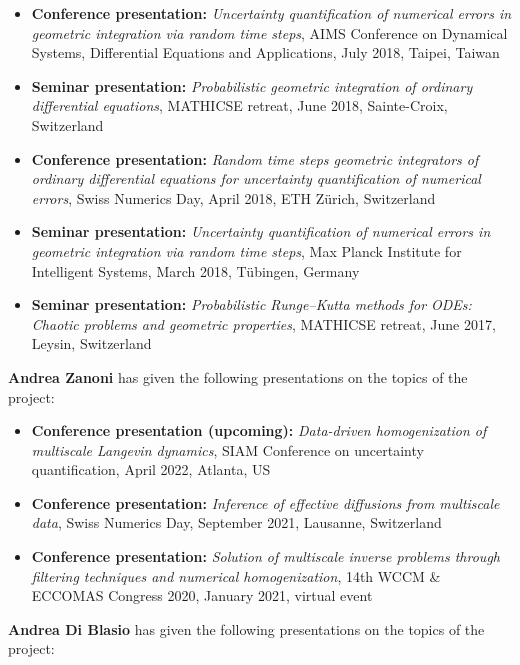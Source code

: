 \documentclass[10pt]{article}
\begin{document}
\begin{itemize}
	\item \textbf{Conference presentation:} \textit{Uncertainty quantification of numerical errors in geometric integration via random time steps}, AIMS Conference on Dynamical Systems, Differential Equations and Applications, July 2018, Taipei, Taiwan
	\item \textbf{Seminar presentation:} \textit{Probabilistic geometric integration of ordinary differential equations}, MATHICSE retreat, June 2018, Sainte-Croix, Switzerland
	\item \textbf{Conference presentation:} \textit{Random time steps geometric integrators of ordinary differential equations for uncertainty quantification of numerical errors}, Swiss Numerics Day, April 2018, ETH Zürich, Switzerland
	\item \textbf{Seminar presentation:} \textit{Uncertainty quantification of numerical errors in geometric integration via random time steps}, Max Planck Institute for Intelligent Systems, March 2018, Tübingen, Germany 
	\item \textbf{Seminar presentation:} \textit{Probabilistic Runge--Kutta methods for ODEs: Chaotic problems and geometric properties}, MATHICSE retreat, June 2017, Leysin, Switzerland
\end{itemize}
%
\textbf{Andrea Zanoni} has given the following presentations on the topics of the project:
\begin{itemize}
	\item \textbf{Conference presentation (upcoming):} \textit{Data-driven homogenization of multiscale Langevin dynamics}, SIAM Conference on uncertainty quantification, April 2022, Atlanta, US
	\item \textbf{Conference presentation:} \textit{Inference of effective diffusions from multiscale data}, Swiss Numerics Day, September 2021, Lausanne, Switzerland
	\item \textbf{Conference presentation:} \textit{Solution of multiscale inverse problems through filtering techniques and numerical homogenization}, 14th WCCM \& ECCOMAS Congress 2020, January 2021, virtual event
\end{itemize}
%
\textbf{Andrea Di Blasio} has given the following presentations on the topics of the project:
\end{document}
